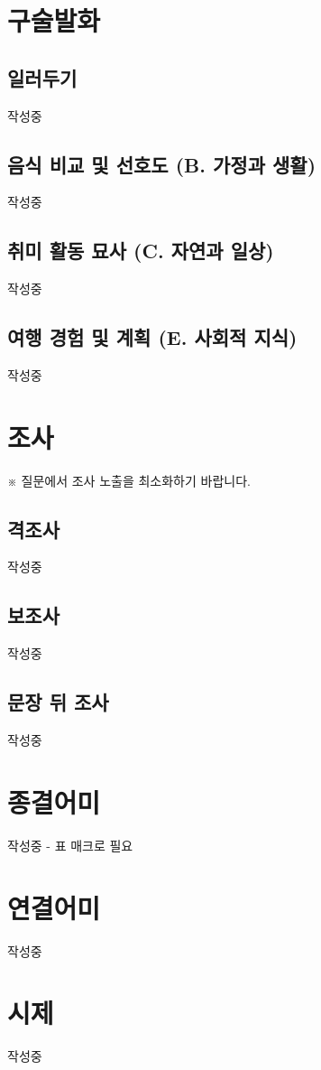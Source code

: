 \documentclass{snu-fl-questionnaire}
\begin{document}
\section{구술발화}
\subsection{일러두기}
작성중

\subsection{음식 비교 및 선호도 (B. 가정과 생활)}
작성중

\subsection{취미 활동 묘사 (C. 자연과 일상)}
작성중

\subsection{여행 경험 및 계획 (E. 사회적 지식)}
작성중

\section{조사}
※ 질문에서 조사 노출을 최소화하기 바랍니다.

\subsection{격조사}
작성중

\subsection{보조사}
작성중

\subsection{문장 뒤 조사}
작성중

\section{종결어미}
작성중 - 표 매크로 필요

\section{연결어미}
작성중

\section{시제}
작성중
\end{document}
